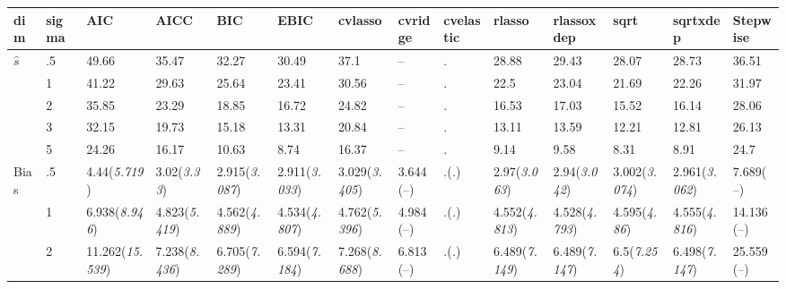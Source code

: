\documentclass{article}
\begin{document}
\begin{table}[tbp] \centering
{}

{\tiny
\begin{tabularx}{\textwidth}{lCCCCCCCCCCCCC}

\toprule
{dim}&{sigma}&{AIC}&{AICC}&{BIC}&{EBIC}&{cvlasso}&{cvridge}&{cvelastic}&{rlasso}&{rlassoxdep}&{sqrt}&{sqrtxdep}&{Stepwise} \tabularnewline
\midrule\addlinespace[1.5ex]
$\hat{s}$&.5&49.66&35.47&32.27&30.49&37.1&--&.&28.88&29.43&28.07&28.73&36.51 \tabularnewline
&1&41.22&29.63&25.64&23.41&30.56&--&.&22.5&23.04&21.69&22.26&31.97 \tabularnewline
&2&35.85&23.29&18.85&16.72&24.82&--&.&16.53&17.03&15.52&16.14&28.06 \tabularnewline
&3&32.15&19.73&15.18&13.31&20.84&--&.&13.11&13.59&12.21&12.81&26.13 \tabularnewline
&5&24.26&16.17&10.63&8.74&16.37&--&.&9.14&9.58&8.31&8.91&24.7 \tabularnewline
\midrule Bias&.5&4.44\newline (\emph{5.719})&3.02\newline (\emph{3.33})&2.915\newline (\emph{3.087})&2.911\newline (\emph{3.033})&3.029\newline (\emph{3.405})&3.644\newline (--)&.\newline (\emph{.})&2.97\newline (\emph{3.063})&2.94\newline (\emph{3.042})&3.002\newline (\emph{3.074})&2.961\newline (\emph{3.062})&7.689\newline (--) \tabularnewline
&1&6.938\newline (\emph{8.946})&4.823\newline (\emph{5.419})&4.562\newline (\emph{4.889})&4.534\newline (\emph{4.807})&4.762\newline (\emph{5.396})&4.984\newline (--)&.\newline (\emph{.})&4.552\newline (\emph{4.813})&4.528\newline (\emph{4.793})&4.595\newline (\emph{4.86})&4.555\newline (\emph{4.816})&14.136\newline (--) \tabularnewline
&2&11.262\newline (\emph{15.539})&7.238\newline (\emph{8.436})&6.705\newline (\emph{7.289})&6.594\newline (\emph{7.184})&7.268\newline (\emph{8.688})&6.813\newline (--)&.\newline (\emph{.})&6.489\newline (\emph{7.149})&6.489\newline (\emph{7.147})&6.5\newline (\emph{7.254})&6.498\newline (\emph{7.147})&25.559\newline (--) \tabularnewline

\end{tabularx}}
\end{table}
\end{document}
